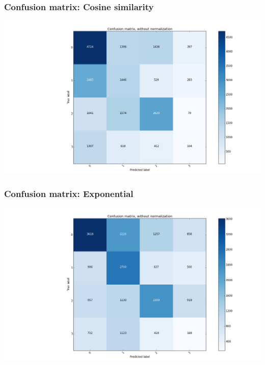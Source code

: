 \documentclass{beamer}
\begin{document}
\begin{frame}
\frametitle{Confusion matrix: Cosine similarity}
    \includegraphics[width=1\linewidth]{../REPORT/Figures_Mik/cosSimConfMat2.png} 
\begin{figure} 
\end{figure}
\end{frame}

\begin{frame}
\frametitle{Confusion matrix: Exponential}
    \includegraphics[width=1\linewidth]{../REPORT/Figures_Mik/bestModel2.png} 
\begin{figure} 
\end{figure}
\end{frame}
\end{document}
